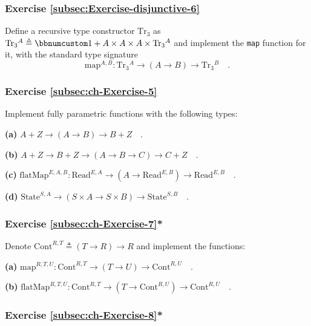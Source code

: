 \subsubsection{Exercise \label{subsec:Exercise-disjunctive-6}\ref{subsec:Exercise-disjunctive-6}}

Define a recursive type constructor $\text{Tr}_{3}$ as $\text{Tr}_{3}{}^{A}\triangleq\bbnum 1+A\times A\times A\times\text{Tr}_{3}{}^{A}$
and implement the \lstinline!map! function for it, with the standard
type signature
\[
\text{map}^{A,B}:\text{Tr}_{3}{}^{A}\rightarrow\left(A\rightarrow B\right)\rightarrow\text{Tr}_{3}{}^{B}\quad.
\]


\subsubsection{Exercise \label{subsec:ch-Exercise-5}\ref{subsec:ch-Exercise-5}}

Implement fully parametric functions with the following types:

\textbf{(a)} $A+Z\rightarrow(A\rightarrow B)\rightarrow B+Z\quad.$

\textbf{(b)} $A+Z\rightarrow B+Z\rightarrow(A\rightarrow B\rightarrow C)\rightarrow C+Z\quad.$

\textbf{(c)} $\text{flatMap}^{E,A,B}:\text{Read}^{E,A}\rightarrow(A\rightarrow\text{Read}^{E,B})\rightarrow\text{Read}^{E,B}\quad.$

\textbf{(d)} $\text{State}^{S,A}\rightarrow\left(S\times A\rightarrow S\times B\right)\rightarrow\text{State}^{S,B}\quad.$

\subsubsection{Exercise \label{subsec:ch-Exercise-7}\ref{subsec:ch-Exercise-7}{*}}

Denote $\text{Cont}^{R,T}\triangleq\left(T\rightarrow R\right)\rightarrow R$
and implement the functions:

\textbf{(a)} $\text{map}^{R,T,U}:\text{Cont}^{R,T}\rightarrow(T\rightarrow U)\rightarrow\text{Cont}^{R,U}\quad.$

\textbf{(b)} $\text{flatMap}^{R,T,U}:\text{Cont}^{R,T}\rightarrow(T\rightarrow\text{Cont}^{R,U})\rightarrow\text{Cont}^{R,U}\quad.$

\subsubsection{Exercise \label{subsec:ch-Exercise-8}\ref{subsec:ch-Exercise-8}{*}}

